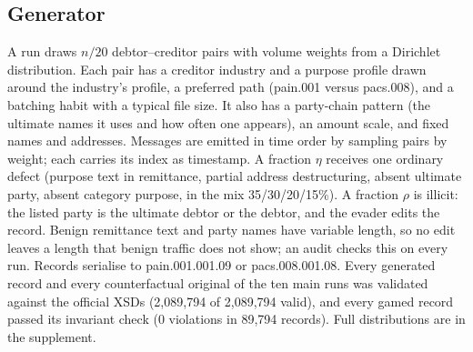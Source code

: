 \documentclass[conference]{IEEEtran}
\begin{document}
\subsection{Generator}
A run draws $n/20$ debtor--creditor pairs with volume weights from a
Dirichlet distribution. Each pair has a creditor industry and a purpose
profile drawn around the industry's profile, a preferred path
(pain.001 versus pacs.008), and a batching habit with a typical file size. It
also has a party-chain pattern (the ultimate names it uses and how often one
appears), an amount scale, and fixed names and addresses. Messages are emitted in time
order by sampling pairs by weight; each carries its index as timestamp. A
fraction $\eta$ receives one ordinary defect (purpose text in remittance,
partial address destructuring, absent ultimate party, absent category
purpose, in the mix 35/30/20/15\%). A fraction $\rho$ is illicit: the listed
party is the ultimate debtor or the debtor, and the evader edits the record.
Benign remittance text and party names have variable length, so no edit
leaves a length that benign traffic does not show; an audit checks this on
every run. Records serialise to pain.001.001.09 or pacs.008.001.08. Every generated
record and every counterfactual original of the ten main runs was validated
against the official XSDs (2{,}089{,}794 of 2{,}089{,}794 valid), and
every gamed record passed its invariant check (0 violations in
89{,}794 records). Full distributions are in the supplement.
\end{document}
